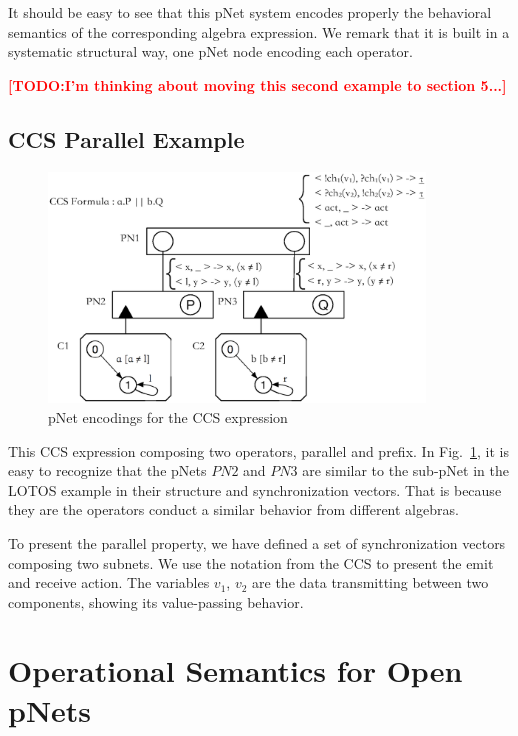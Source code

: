 \documentclass{lncs/llncs}
\newcommand{\TODO}[1]{\textcolor{red}{\textbf{[TODO:#1]}}}
\newcommand{\QIN}[1]{\textcolor{airforceblue}{#1}}
\begin{document}
It should be easy to see that this pNet system encodes properly the
behavioral semantics of the corresponding algebra expression. We remark
that it is built in a systematic structural way, one pNet node
encoding each operator.

\TODO{I'm thinking about moving this second example to section 5...}

\subsection{CCS Parallel Example}

\begin{figure}[h]
  \centerline{\includegraphics[width=10cm]{XFIG/CCS1.eps}}
  \caption{pNet encodings for the CCS expression}  \label{schema:ccs-pnet}
\end{figure}

\QIN{
This CCS expression composing two operators, parallel and prefix. In Fig.~\ref{schema:ccs-pnet}, 
it is easy to recognize that the pNets $PN2$ and $PN3$ are similar to 
the sub-pNet in the LOTOS example in their structure and synchronization vectors. 
That is because they are the operators conduct a similar behavior from different algebras.
}

\QIN{
To present the parallel property, we have defined a set of synchronization vectors composing 
two subnets. We use the notation from the CCS to present the emit and receive action. 
The variables $v_1$, $v_2$ are the data transmitting between two components, 
showing its value-passing behavior.
}






\section{Operational Semantics for Open pNets}
\label{section:op-semantics}
\end{document}
